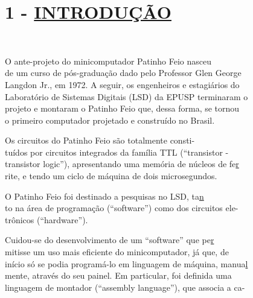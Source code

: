\documentclass[a4paper,12pt]{article}
\begin{document}
\newpage

\setcounter{page}{1}
\setcounter{section}{1}

\section*{1 - \uline{INTRODUÇÃO}}

\noindent \\
\par
O ante-projeto do minicomputador Patinho Feio nasceu\\
de um curso de pós-graduação dado pelo Professor Glen \hfill George\\
Langdon Jr., em 1972. A seguir, os engenheiros e estagiários do\\
Laboratório de Sistemas Digitais (LSD) da EPUSP terminaram \hfill o\\
projeto e montaram o Patinho Feio que, dessa forma, se \hfill tornou\\
o primeiro computador projetado e construído no Brasil.\\
\par
Os circuitos do Patinho Feio são totalmente \hfill consti-\\
tuídos por circuitos integrados da família TTL (``transistor \hfill -\\
transistor logic''), apresentando uma memória de núcleos de fe\uline r\\
rite, e tendo um ciclo de máquina de dois microsegundos.\\
\par
O Patinho Feio foi destinado a pesquisas no LSD, ta\uline n\\
to na área de programação (``software'') como dos circuitos ele-\\
trônicos (``hardware'').\\
\par
Cuidou-se do desenvolvimento de um ``software'' que pe\uline r\\
mitisse um uso mais eficiente do minicomputador, já que, \hfill de\\
início só se podia programá-lo em linguagem de máquina, manua\uline l\\
mente, através do seu painel. Em particular, foi definida \hfill uma\\
linguagem de montador (``assembly language''), que associa a ca-\\
\end{document}
